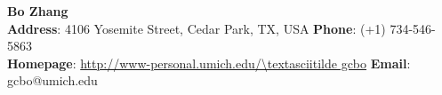 \documentclass[11pt]{res}
\newcommand{\style}[1]{\color{Blue}\large\textsc{#1}}
\begin{document}
\begin{center}
\vspace{-3cm}

\textbf{\LARGE Bo Zhang}\\
\vspace{-1.0mm}
\hspace{-1.35cm}
{\indent \bf Address}: 4106 Yosemite Street, Cedar Park,  TX, USA \hfill {\bf Phone}: (+1) 734-546-5863\\
\vspace{-1.2mm}
\hspace{-1.35cm}
{\indent \bf Homepage}: {\color{Blue}\url{http://www-personal.umich.edu/\textasciitilde gcbo}} \hfill {\bf Email}: gcbo@umich.edu\\
\end{center}


\begin{resume}


\vspace{-35pt}


\end{resume}
\end{document}
